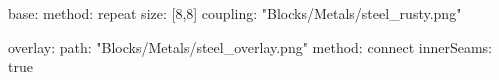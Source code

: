 base:
  method: repeat
  size: [8,8]
  coupling: "Blocks/Metals/steel_rusty.png"
  
overlay:
  path: "Blocks/Metals/steel_overlay.png"
  method: connect
  innerSeams: true